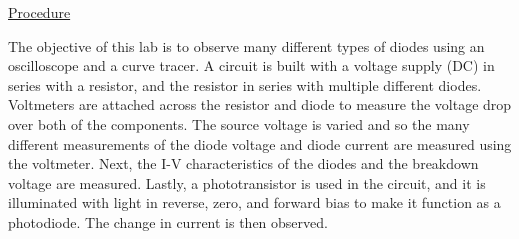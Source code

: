 \underline{Procedure}

The objective of this lab is to observe many different types of diodes using an oscilloscope and a curve tracer. A circuit is built with a voltage supply (DC) in series with a resistor, and the resistor in series with multiple different diodes. Voltmeters are attached across the resistor and diode to measure the voltage drop over both of the components. The source voltage is varied and so the many different measurements of the diode voltage and diode current are measured using the voltmeter. Next, the I-V characteristics of the diodes and the breakdown voltage are measured. Lastly, a phototransistor is used in the circuit, and it is illuminated with light in reverse, zero, and forward bias to make it function as a photodiode. The change in current is then observed. \\

